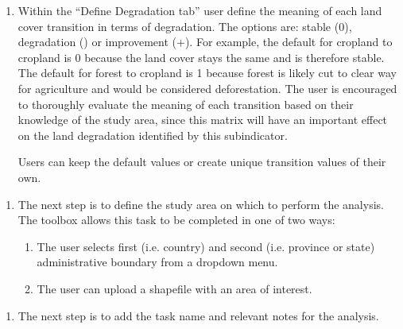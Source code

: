 \documentclass[letterpaper,10pt,english]{sphinxmanual}
\begin{document}
\begin{enumerate}
%
\setcounter{enumi}{3}
\item {} 
\sphinxAtStartPar
Within the “Define Degradation tab” user define the meaning of each land
cover transition in terms of degradation. The options are: stable (0),
degradation (\sphinxhyphen{}) or improvement (+). For example, the default for cropland to
cropland is 0 because the land cover stays the same and is therefore stable.
The default for forest to cropland is \sphinxhyphen{}1 because forest is likely cut to
clear way for agriculture and would be considered deforestation. The user is
encouraged to thoroughly evaluate the meaning of each transition based on
their knowledge of the study area, since this matrix will have an important
effect on the land degradation identified by this subindicator.

\sphinxAtStartPar
Users can keep the default values or create unique transition values of
their own.

\end{enumerate}

\begin{enumerate}
%
\setcounter{enumi}{4}
\item {} 
\sphinxAtStartPar
The next step is to define the study area on which to perform the analysis.
The toolbox allows this task to be completed in one of two ways:
\begin{enumerate}
%
\item {} 
\sphinxAtStartPar
The user selects first (i.e. country) and second (i.e. province or state)
administrative boundary from a drop\sphinxhyphen{}down menu.

\item {} 
\sphinxAtStartPar
The user can upload a shapefile with an area of interest.

\end{enumerate}

\end{enumerate}

\begin{enumerate}
%
\setcounter{enumi}{5}
\item {} 
\sphinxAtStartPar
The next step is to add the task name and relevant notes for the analysis.

\end{enumerate}
\end{document}
